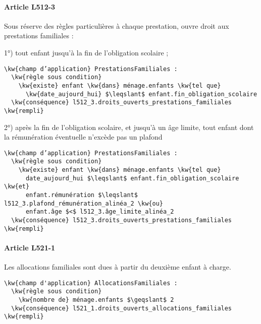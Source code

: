 \documentclass[12pt, french]{article}
\newcommand{\kw}[1]{\textbf{\textcolor{OliveGreen}{#1}}}
\begin{document}
\paragraph{Article L512-3} Sous réserve des règles particulières à chaque prestation, ouvre droit aux prestations familiales :

1°) tout enfant jusqu’à la fin de l’obligation scolaire ;
\begin{Verbatim}[firstnumber=1]
\kw{champ d’application} PrestationsFamiliales :
  \kw{règle sous condition}
    \kw{existe} enfant \kw{dans} ménage.enfants \kw{tel que}
      \kw{date_aujourd_hui} $\leqslant$ enfant.fin_obligation_scolaire
  \kw{conséquence} l512_3.droits_ouverts_prestations_familiales \kw{rempli}
\end{Verbatim}

2°) après la fin de l’obligation scolaire, et jusqu’à un âge limite, tout enfant dont la rémunération éventuelle n’excède pas un plafond

\begin{Verbatim}
\kw{champ d’application} PrestationsFamiliales :
  \kw{règle sous condition}
    \kw{existe} enfant \kw{dans} ménage.enfants \kw{tel que}
      date_aujourd_hui $\leqslant$ enfant.fin_obligation_scolaire \kw{et}
      enfant.rémunération $\leqslant$ l512_3.plafond_rémunération_alinéa_2 \kw{ou}
      enfant.âge $<$ l512_3.âge_limite_alinéa_2
  \kw{conséquence} l512_3.droits_ouverts_prestations_familiales \kw{rempli}
\end{Verbatim}

\paragraph{Article L521-1}

Les allocations familiales sont dues à partir du deuxième enfant à charge.

\begin{Verbatim}
\kw{champ d'application} AllocationsFamiliales :
  \kw{règle sous condition}
    \kw{nombre de} ménage.enfants $\geqslant$ 2
  \kw{conséquence} l521_1.droits_ouverts_allocations_familiales \kw{rempli}
\end{Verbatim}
\end{document}
